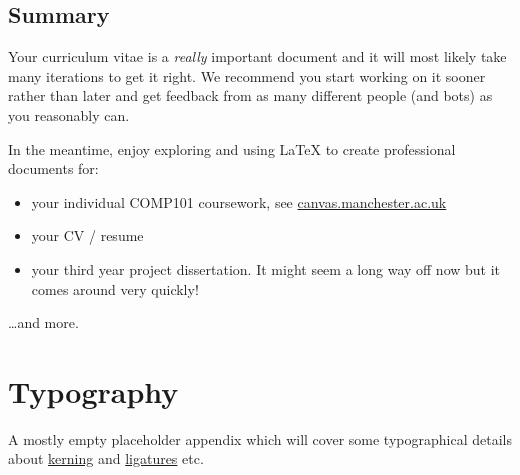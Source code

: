 \documentclass[
]{book}
\providecommand{\tightlist}{%
  \setlength{\itemsep}{0pt}\setlength{\parskip}{0pt}}
\begin{document}
\section{Summary}\label{cvconc}

Your curriculum vitae is a \emph{really} important document and it will most likely take many iterations to get it right. We recommend you start working on it sooner rather than later and get feedback from as many different people (and bots) as you reasonably can.

In the meantime, enjoy exploring and using LaTeX to create professional documents for:

\begin{itemize}
\tightlist
\item
  your individual COMP101 coursework, see \href{https://canvas.manchester.ac.uk/}{canvas.manchester.ac.uk}
\item
  your CV / resume
\item
  your third year project dissertation. It might seem a long way off now but it comes around very quickly!
\end{itemize}

\ldots and more.

\appendix


\chapter{Typography}\label{typography}

A mostly empty placeholder appendix which will cover some typographical details about \href{https://en.wikipedia.org/wiki/Kerning}{kerning} and \href{https://en.wikipedia.org/wiki/Orthographic_ligature}{ligatures} etc.


\end{document}
